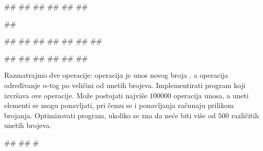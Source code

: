\begin{Exercise}[label=3_25]
\begin{minitest}
\begin{test}{2}
#\naslovIzlaz#
##
##
##
##
##
\end{test}
\end{minitest}
\begin{minitest}
\begin{test}{3}
##
  
##
##
##
##
##
##
##

#\naslovIzlaz#
##
##
##
##
##
\end{test}
\end{minitest}

\end{Exercise}

\begin{Answer}[ref=3_25]
\end{Answer}
\begin{Exercise}[difficulty=1, label=3_26]
  Razmatrajmo dve operacije: operacija  je unos novog broja
  , a operacija  određivanje $n$-tog po veličini od
  unetih brojeva. Implementirati program koji izvršava ove
  operacije. Može postojati najviše $100000$ operacija unosa, a uneti
  elementi se mogu ponavljati, pri čemu se i ponavljanja računaju
  prilikom brojanja.  Optimizovati
  program, ukoliko se zna da neće biti više od $500$ različitih unetih
  brojeva.
  
\begin{maxitest}
\begin{upotreba}{1}
#\naslovInt#
##
#
\end{upotreba}
\end{maxitest}
  
\end{Exercise}

